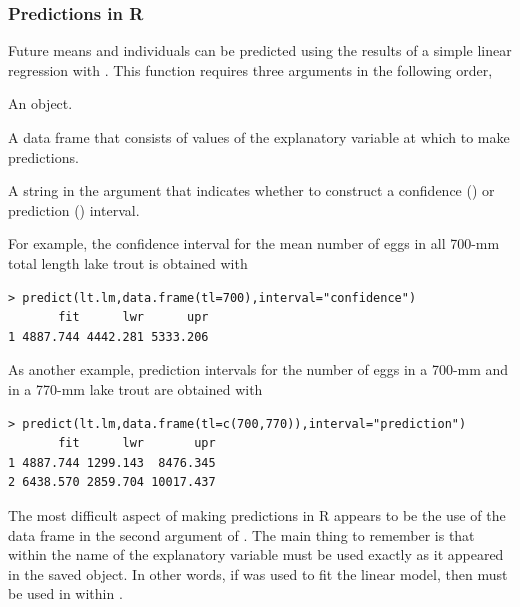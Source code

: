 \documentclass[10pt,openany]{book}\usepackage[]{graphicx}\usepackage[]{color}
\makeatletter
\newenvironment{kframe}{%
 \def\at@end@of@kframe{}%
 \ifinner\ifhmode%
  \def\at@end@of@kframe{\end{minipage}}%
  \begin{minipage}{\columnwidth}%
 \fi\fi%
 \def\FrameCommand##1{\hskip\@totalleftmargin \hskip-\fboxsep
 \colorbox{shadecolor}{##1}\hskip-\fboxsep
     \hskip-\linewidth \hskip-\@totalleftmargin \hskip\columnwidth}%
 \MakeFramed {\advance\hsize-\width
   \@totalleftmargin\z@ \linewidth\hsize
   \@setminipage}}%
 {\par\unskip\endMakeFramed%
 \at@end@of@kframe}
\newenvironment{knitrout}{}{} %
\makeatother
\begin{document}
\subsubsection*{Predictions in R}
Future means and individuals can be predicted using the results of a simple linear regression with .  This function requires three arguments in the following order,
\begin{Itemize}
  \item An  object.
  \item A data frame that consists of values of the explanatory variable at which to make predictions.
  \item A string in the  argument that indicates whether to construct a confidence () or prediction () interval.
\end{Itemize}
For example, the confidence interval for the mean number of eggs in all 700-mm total length lake trout is obtained with

\begin{knitrout}
\color{fgcolor}\begin{kframe}
\begin{verbatim}
> predict(lt.lm,data.frame(tl=700),interval="confidence")
       fit      lwr      upr
1 4887.744 4442.281 5333.206
\end{verbatim}
\end{kframe}
\end{knitrout}

As another example, prediction intervals for the number of eggs in a 700-mm and in a 770-mm lake trout are obtained with

\begin{knitrout}
\color{fgcolor}\begin{kframe}
\begin{verbatim}
> predict(lt.lm,data.frame(tl=c(700,770)),interval="prediction")
       fit      lwr       upr
1 4887.744 1299.143  8476.345
2 6438.570 2859.704 10017.437
\end{verbatim}
\end{kframe}
\end{knitrout}

The most difficult aspect of making predictions in R appears to be the use of the data frame in the second argument of .  The main thing to remember is that within  the name of the explanatory variable must be used exactly as it appeared in the saved  object.  In other words, if  was used to fit the linear model, then  must be used in  within .
\end{document}
